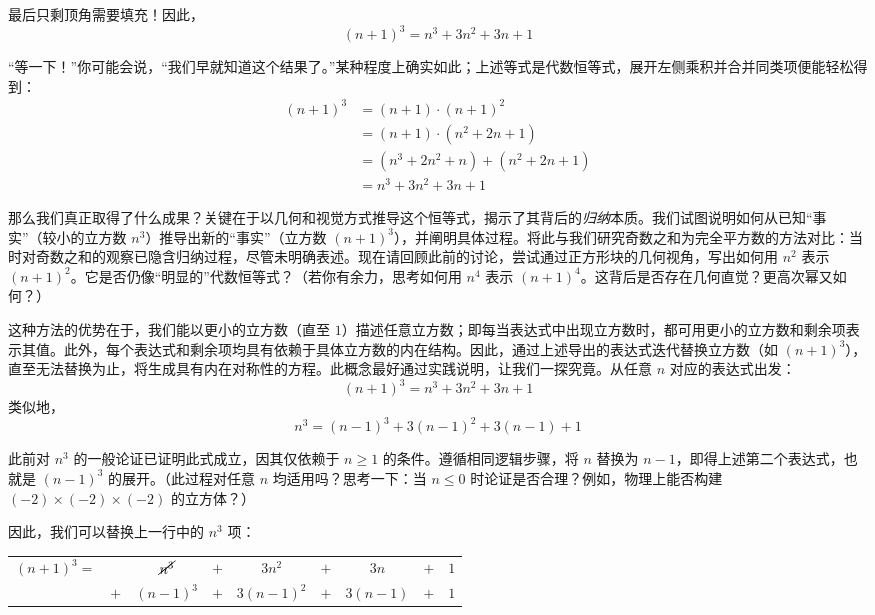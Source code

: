 最后只剩顶角需要填充！因此，
\[(n+1)^3 = n^3+3n^2+3n+1\]

``等一下！''你可能会说，``我们早就知道这个结果了。''某种程度上确实如此；上述等式是代数恒等式，展开左侧乘积并合并同类项便能轻松得到：
\begin{align*}
    (n + 1)^3 &= (n + 1) \cdot (n + 1)^2\\
    &= (n + 1) \cdot (n^2 + 2n + 1)\\
    &= (n^3 + 2n^2 + n) + (n^2 + 2n + 1) \\
    &= n^3 + 3n^2 + 3n + 1
\end{align*}

那么我们真正取得了什么成果？关键在于以几何和视觉方式推导这个恒等式，揭示了其背后的\emph{归纳}本质。我们试图说明如何从已知``事实''（较小的立方数 $n^3$）推导出新的``事实''（立方数 $(n + 1)^3$），并阐明具体过程。将此与我们研究奇数之和为完全平方数的方法对比：当时对奇数之和的观察已隐含归纳过程，尽管未明确表述。现在请回顾此前的讨论，尝试通过正方形块的几何视角，写出如何用 $n^2$ 表示 $(n + 1)^2$。它是否仍像``明显的''代数恒等式？（若你有余力，思考如何用 $n^4$ 表示 $(n + 1)^4$。这背后是否存在几何直觉？更高次幂又如何？）

这种方法的优势在于，我们能以更小的立方数（直至 $1$）描述任意立方数；即每当表达式中出现立方数时，都可用更小的立方数和剩余项表示其值。此外，每个表达式和剩余项均具有依赖于具体立方数的内在结构。因此，通过上述导出的表达式迭代替换立方数（如 $(n + 1)^3$），直至无法替换为止，将生成具有内在对称性的方程。此概念最好通过实践说明，让我们一探究竟。从任意 $n$ 对应的表达式出发：
\[(n+1)^3 = n^3+3n^2+3n+1\]
类似地，
\[n^3 = (n-1)^3+3(n-1)^2+3(n-1)+1\]

此前对 $n^3$ 的一般论证已证明此式成立，因其仅依赖于 $n \ge 1$ 的条件。遵循相同逻辑步骤，将 $n$ 替换为 $n - 1$，即得上述第二个表达式，也就是 $(n - 1)^3$ 的展开。（此过程对任意 $n$ 均适用吗？思考一下：当 $n \le 0$ 时论证是否合理？例如，物理上能否构建 $(-2) \times (-2) \times (-2)$ 的立方体？）

因此，我们可以替换上一行中的 $n^3$ 项：

\begin{center}
    \begin{tabular}{rcccccccc}
        $(n+1)^3=$ &     & $\cancel{n^3}$ & $+$ &   $3n^2$   & $+$ &   $3n$   & $+$ & $1$\\
                   & $+$ & $(n-1)^3$      & $+$ & $3(n-1)^2$ & $+$ & $3(n-1)$ & $+$ & $1$\\
    \end{tabular}
\end{center}

